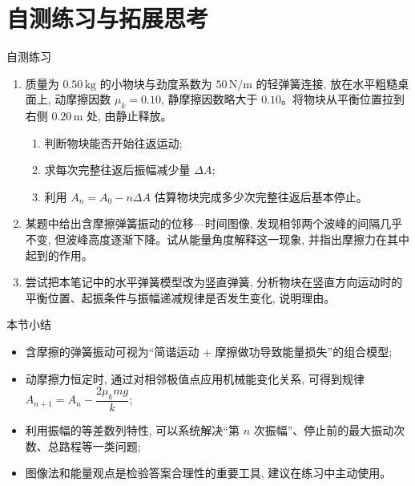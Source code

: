 \documentclass[a4paper,11pt]{ctexart}
\begin{document}
\section{自测练习与拓展思考}

\begin{notebox}{自测练习}
\begin{enumerate}
  \item 质量为 $0.50\,\mathrm{kg}$ 的小物块与劲度系数为 $50\,\mathrm{N/m}$ 的轻弹簧连接, 放在水平粗糙桌面上, 动摩擦因数 $\mu_k=0.10$, 静摩擦因数略大于 $0.10$。将物块从平衡位置拉到右侧 $0.20\,\mathrm{m}$ 处, 由静止释放。
  \begin{enumerate}
    \item 判断物块能否开始往返运动;
    \item 求每次完整往返后振幅减少量 $\Delta A$;
    \item 利用 $A_n=A_0-n\Delta A$ 估算物块完成多少次完整往返后基本停止。
  \end{enumerate}
  \item 某题中给出含摩擦弹簧振动的位移—时间图像, 发现相邻两个波峰的间隔几乎不变, 但波峰高度逐渐下降。试从能量角度解释这一现象, 并指出摩擦力在其中起到的作用。
  \item 尝试把本笔记中的水平弹簧模型改为竖直弹簧, 分析物块在竖直方向运动时的平衡位置、起振条件与振幅递减规律是否发生变化, 说明理由。
\end{enumerate}
\end{notebox}

\begin{summarybox}{本节小结}
\begin{itemize}
  \item 含摩擦的弹簧振动可视为“简谐运动 + 摩擦做功导致能量损失”的组合模型;
  \item 动摩擦力恒定时, 通过对相邻极值点应用机械能变化关系, 可得到规律 $A_{n+1}=A_n-\dfrac{2\mu_k mg}{k}$;
  \item 利用振幅的等差数列特性, 可以系统解决“第 $n$ 次振幅”、停止前的最大振动次数、总路程等一类问题;
  \item 图像法和能量观点是检验答案合理性的重要工具, 建议在练习中主动使用。
\end{itemize}
\end{summarybox}
\end{document}
